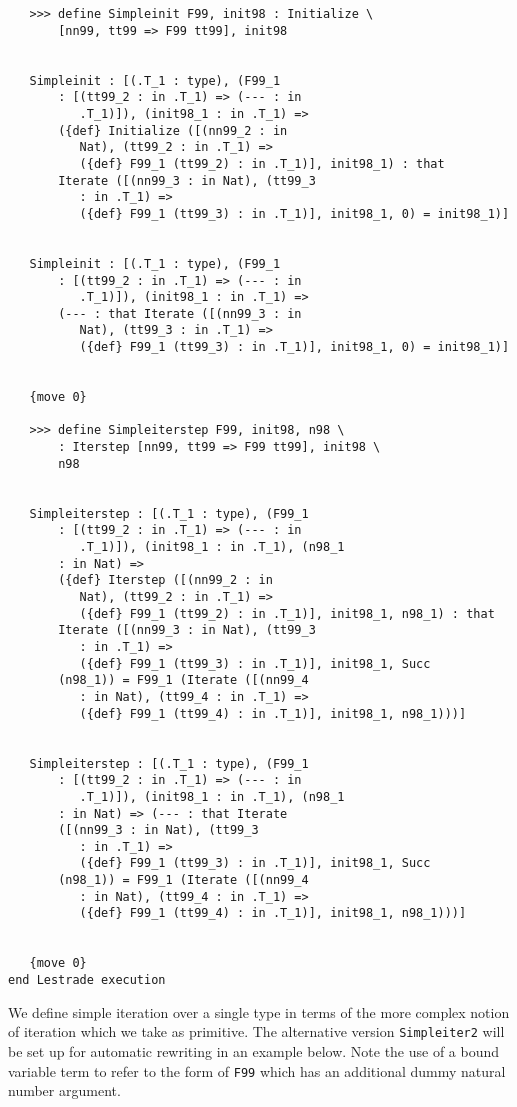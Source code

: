 \documentclass[12pt]{article}
\begin{document}
\begin{verbatim}
   >>> define Simpleinit F99, init98 : Initialize \
       [nn99, tt99 => F99 tt99], init98


   Simpleinit : [(.T_1 : type), (F99_1 
       : [(tt99_2 : in .T_1) => (--- : in 
          .T_1)]), (init98_1 : in .T_1) => 
       ({def} Initialize ([(nn99_2 : in 
          Nat), (tt99_2 : in .T_1) => 
          ({def} F99_1 (tt99_2) : in .T_1)], init98_1) : that 
       Iterate ([(nn99_3 : in Nat), (tt99_3 
          : in .T_1) => 
          ({def} F99_1 (tt99_3) : in .T_1)], init98_1, 0) = init98_1)]


   Simpleinit : [(.T_1 : type), (F99_1 
       : [(tt99_2 : in .T_1) => (--- : in 
          .T_1)]), (init98_1 : in .T_1) => 
       (--- : that Iterate ([(nn99_3 : in 
          Nat), (tt99_3 : in .T_1) => 
          ({def} F99_1 (tt99_3) : in .T_1)], init98_1, 0) = init98_1)]


   {move 0}

   >>> define Simpleiterstep F99, init98, n98 \
       : Iterstep [nn99, tt99 => F99 tt99], init98 \
       n98


   Simpleiterstep : [(.T_1 : type), (F99_1 
       : [(tt99_2 : in .T_1) => (--- : in 
          .T_1)]), (init98_1 : in .T_1), (n98_1 
       : in Nat) => 
       ({def} Iterstep ([(nn99_2 : in 
          Nat), (tt99_2 : in .T_1) => 
          ({def} F99_1 (tt99_2) : in .T_1)], init98_1, n98_1) : that 
       Iterate ([(nn99_3 : in Nat), (tt99_3 
          : in .T_1) => 
          ({def} F99_1 (tt99_3) : in .T_1)], init98_1, Succ 
       (n98_1)) = F99_1 (Iterate ([(nn99_4 
          : in Nat), (tt99_4 : in .T_1) => 
          ({def} F99_1 (tt99_4) : in .T_1)], init98_1, n98_1)))]


   Simpleiterstep : [(.T_1 : type), (F99_1 
       : [(tt99_2 : in .T_1) => (--- : in 
          .T_1)]), (init98_1 : in .T_1), (n98_1 
       : in Nat) => (--- : that Iterate 
       ([(nn99_3 : in Nat), (tt99_3 
          : in .T_1) => 
          ({def} F99_1 (tt99_3) : in .T_1)], init98_1, Succ 
       (n98_1)) = F99_1 (Iterate ([(nn99_4 
          : in Nat), (tt99_4 : in .T_1) => 
          ({def} F99_1 (tt99_4) : in .T_1)], init98_1, n98_1)))]


   {move 0}
end Lestrade execution
\end{verbatim}

We define simple iteration over a single type in terms of the more complex notion of iteration which we take as primitive.  The alternative version {\tt Simpleiter2} will be set up for automatic rewriting in an example below.  Note the use of a bound variable term to refer to the form of {\tt F99} which has an additional dummy natural number argument.
\end{document}
